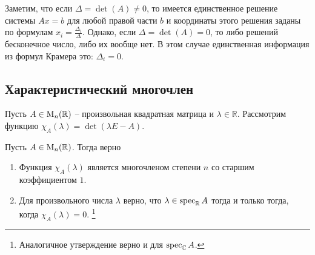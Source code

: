 Заметим, что если $\Delta = \det (A) \neq 0$, то имеется единственное решение системы $Ax = b$ для любой правой части $b$ и координаты этого решения заданы по формулам $x_i =\frac{\Delta_i}{\Delta}$.
Однако, если $\Delta = \det(A) = 0$, то либо решений бесконечное число, либо их вообще нет.
В этом случае единственная информация из формул Крамера это: $\Delta_i = 0$.


\subsection{Характеристический многочлен}
\label{section::CharPoly}

Пусть $A\in\operatorname{M}_{n}(\mathbb R)$ -- произвольная квадратная матрица и $\lambda \in\mathbb R$.
Рассмотрим функцию $\chi_A(\lambda) = \det(\lambda E - A)$.

\begin{claim}
\label{claim::CharSpec}
Пусть $A\in\operatorname{M}_{n}(\mathbb R)$.
Тогда верно
\begin{enumerate}
\item Функция $\chi_A(\lambda)$ является многочленом степени $n$ со старшим коэффициентом $1$.

\item Для произвольного числа $\lambda$ верно, что $\lambda \in\operatorname{spec}_\mathbb R A$ тогда и только тогда, когда $\chi_A(\lambda) = 0$.%
\footnote{Аналогичное утверждение верно и для $\operatorname{spec}_\mathbb C A$.}
\end{enumerate}
\end{claim}
